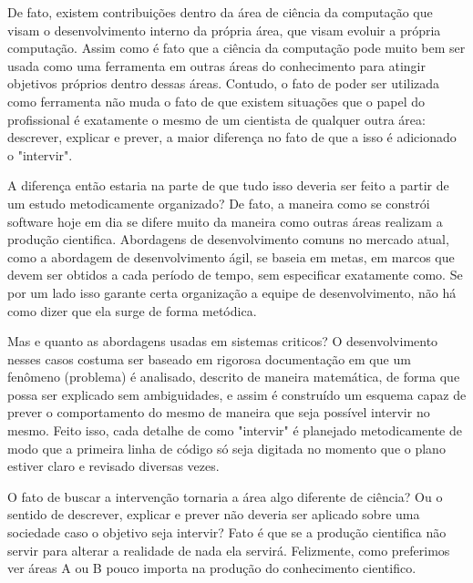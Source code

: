 De fato, existem contribuições dentro da área de ciência da computação que visam o desenvolvimento interno da própria área, que visam evoluir a própria computação. Assim como é fato que a ciência da computação pode muito bem ser usada como uma ferramenta em outras áreas do conhecimento para atingir objetivos próprios dentro dessas áreas. Contudo, o fato de poder ser utilizada como ferramenta não muda o fato de que existem situações que o papel do profissional é exatamente o mesmo de um cientista de qualquer outra área: descrever, explicar e prever, a maior diferença no fato de que a isso é adicionado o "intervir".

A diferença então estaria na parte de que tudo isso deveria ser feito a partir de um estudo metodicamente organizado? De fato, a maneira como se constrói software hoje em dia se difere muito da maneira como outras áreas realizam a produção cientifica. Abordagens de desenvolvimento comuns no mercado atual, como a abordagem de desenvolvimento ágil, se baseia em metas, em marcos que devem ser obtidos a cada período de tempo, sem especificar exatamente como. Se por um lado isso garante certa organização a equipe de desenvolvimento, não há como dizer que ela surge de forma metódica.

Mas e quanto as abordagens usadas em sistemas criticos? O desenvolvimento nesses casos costuma ser baseado em rigorosa documentação em que um fenômeno (problema) é analisado, descrito de maneira matemática, de forma que possa ser explicado sem ambiguidades, e assim é construído um esquema capaz de prever o comportamento do mesmo de maneira que seja possível intervir no mesmo. Feito isso, cada detalhe de como "intervir" é planejado metodicamente de modo que a primeira linha de código só seja digitada no momento que o plano estiver claro e revisado diversas vezes.

O fato de buscar a intervenção tornaria a área algo diferente de ciência? Ou o sentido de descrever, explicar e prever não deveria ser aplicado sobre uma sociedade caso o objetivo seja intervir? Fato é que se a produção cientifica não servir para alterar a realidade de nada ela servirá. Felizmente, como preferimos ver áreas A ou B pouco importa na produção do conhecimento cientifico.